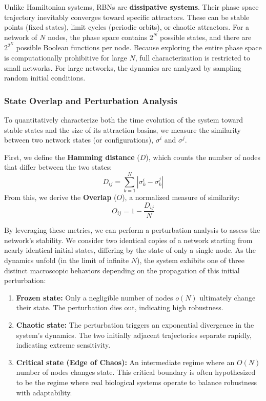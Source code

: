 Unlike Hamiltonian systems, RBNs are \textbf{dissipative systems}. Their phase space trajectory inevitably converges toward specific attractors. These can be stable points (fixed states), limit cycles (periodic orbits), or chaotic attractors.
For a network of \(N\) nodes, the phase space contains \(2^N\) possible states, and there are \(2^{2^K}\) possible Boolean functions per node. Because exploring the entire phase space is computationally prohibitive for large \(N\), full characterization is restricted to small networks. For large networks, the dynamics are analyzed by sampling random initial conditions.


\subsubsection{State Overlap and Perturbation Analysis}
\label{subsubsec:overlap_perturbation}

To quantitatively characterize both the time evolution of the system toward stable states and the size of its attraction basins, we measure the similarity between two network states (or configurations), \(\sigma^i\) and \(\sigma^j\).

First, we define the \textbf{Hamming distance} (\(D\)), which counts the number of nodes that differ between the two states:
\[
    D_{ij} = \sum_{k=1}^{N} \left| \sigma_k^i - \sigma_k^j \right|
\]
From this, we derive the \textbf{Overlap} (\(O\)), a normalized measure of similarity:
\[
    O_{ij} = 1 - \frac{D_{ij}}{N}
\]

By leveraging these metrics, we can perform a perturbation analysis to assess the network's stability. We consider two identical copies of a network starting from nearly identical initial states, differing by the state of only a single node. As the dynamics unfold (in the limit of infinite \(N\)), the system exhibits one of three distinct macroscopic behaviors depending on the propagation of this initial perturbation:
\begin{enumerate}
    \item \textbf{Frozen state:} Only a negligible number of nodes \(o(N)\) ultimately change their state. The perturbation dies out, indicating high robustness.
    \item \textbf{Chaotic state:} The perturbation triggers an exponential divergence in the system's dynamics. The two initially adjacent trajectories separate rapidly, indicating extreme sensitivity.
    \item \textbf{Critical state (Edge of Chaos):} An intermediate regime where an \(O(N)\) number of nodes changes state. This critical boundary is often hypothesized to be the regime where real biological systems operate to balance robustness with adaptability.
\end{enumerate}

